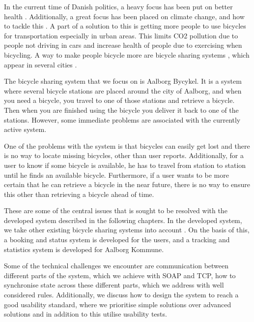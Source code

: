	
	

In the current time of Danish politics, a heavy focus has been put on better health \citep{misc:nationalemaalhelbred}.
Additionally, a great focus has been placed on climate change, and how to tackle this \citep{misc:klima}.
A part of a solution to this is getting more people to use bicycles for transportation especially in urban areas.
This limits CO2 pollution due to people not driving in cars and increase health of people due to exercising when bicycling.
A way to make people bicycle more are bicycle sharing systems \citep{misc:impactofbikeshare}, which appear in several cities \citep{misc:cibi, misc:bycyklen, misc:AltaBicycleShare, misc:aalborgbycykelMain}.

The bicycle sharing system that we focus on is Aalborg Bycykel.
It is a system where several bicycle stations are placed around the city of Aalborg, and when you need a bicycle, you travel to one of those stations and retrieve a bicycle.
Then when you are finished using the bicycle you deliver it back to one of the stations.
However, some immediate problems are associated with the currently active system.

One of the problems with the system is that bicycles can easily get lost and there is no way to locate missing bicycles, other than user reports.
Additionally, for a user to know if some bicycle is available, he has to travel from station to station until he finds an available bicycle.
Furthermore, if a user wants to be more certain that he can retrieve a bicycle in the near future, there is no way to ensure this other than retrieving a bicycle ahead of time.

These are some of the central issues that is sought to be resolved with the developed system described in the following chapters.
In the developed system, we take other existing bicycle sharing systems into account \citep{misc:cibi, misc:bycyklen, misc:AltaBicycleShare}.
On the basis of this, a booking and status system is developed for the users, and a tracking and statistics system is developed for Aalborg Kommune.

Some of the technical challenges we encounter are communication between different parts of the system, which we achieve with SOAP and TCP, how to synchronise state across these different parts, which we address with well considered rules.
Additionally, we discuss how to design the system to reach a good usability standard, where we prioritise simple solutions over advanced solutions and in addition to this utilise usability tests.

